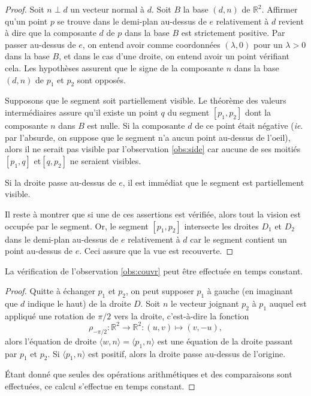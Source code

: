 \begin{proof}
  Soit $n\perp d$ un vecteur normal à $d$. Soit $B$ la base $(d, n)$
  de $\mathbb R^2$. Affirmer qu'un point $p$ se trouve
  dans le demi-plan au-dessus de $e$ relativement à $d$ revient à dire
  que la composante $d$ de $p$ dans la base $B$ est strictement
  positive. Par passer au-dessus de $e$, on entend avoir comme coordonnées
  $(\lambda, 0)$ pour un $\lambda >0$ dans la base $B$, et dans le cas d'une
  droite, on entend avoir un point vérifiant cela.
  Les hypothèses assurent que le signe de la composante $n$ dans la base
  $(d, n)$ de $p_1$ et $p_2$ sont opposés.

  Supposons que le segment soit partiellement visible. Le théorème
  des valeurs intermédiaires assure qu'il existe un point $q$ du segment
  $[p_1, p_2]$ dont la composante $n$ dans $B$ est nulle. Si la
  composante $d$ de ce point était négative (\emph{ie}. par l'absurde,
  on suppose que le segment n'a aucun point au-dessus de l'oeil),
  alors il ne serait pas visible par l'observation \ref{obs:side} 
  car aucune de ses moitiés $[p_1, q]$ et$[q, p_2]$ ne seraient visibles.

  Si la droite passe au-dessus de $e$, il est immédiat que le segment
  est partiellement visible.

  Il reste à montrer que si une de ces assertions est vérifiée, alors
  tout la vision est occupée par le segment. Or, le segment
  $[p_1, p_2]$ intersecte les droites $D_1$ et $D_2$ dans le demi-plan
  au-dessus de $e$ relativement à $d$ car le segment contient un point
  au-dessus de $e$. Ceci assure que la vue est recouverte.
\end{proof}
\begin{lem}\label{lem:couvr}
  La vérification de l'observation \ref{obs:couvr} peut être effectuée en
  temps constant.
\end{lem}
\begin{proof}
  Quitte à échanger $p_1$ et $p_2$, on peut supposer $p_1$ à gauche
  (en imaginant que $d$ indique le haut) de la droite $D$.
  Soit $n$ le vecteur joignant $p_2$ à $p_1$ auquel est appliqué
  une rotation de $\pi/2$ vers la droite, c'est-à-dire la fonction
  $$ \rho_{-\pi/2}:\mathbb R^2\to\mathbb R^2: (u, v)\mapsto (v, -u),$$
  alors l'équation de droite $\langle w, n\rangle = \langle p_1, n\rangle$
  est une équation de la droite passant par $p_1$ et $p_2$.
  Si $\langle p_1, n\rangle$ est positif, alors la droite passe au-dessus
  de l'origine.

  \'Etant donné que seules des opérations arithmétiques et des comparaisons
  sont effectuées, ce calcul s'effectue en temps constant.
\end{proof}

